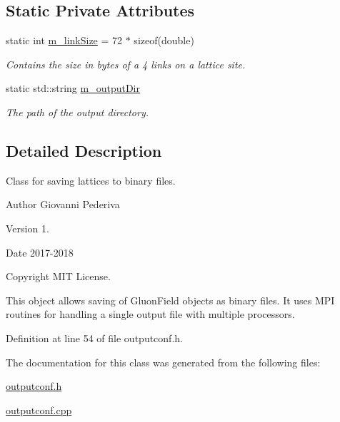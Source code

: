 \subsection*{Static Private Attributes}
\begin{DoxyCompactItemize}
\item 
static int \hyperlink{classLatticeIO_1_1OutputConf_a6866129cf7fe3c5e36034296b2e1bf15}{m\+\_\+link\+Size} = 72 $\ast$ sizeof(double)\hypertarget{classLatticeIO_1_1OutputConf_a6866129cf7fe3c5e36034296b2e1bf15}{}\label{classLatticeIO_1_1OutputConf_a6866129cf7fe3c5e36034296b2e1bf15}

\begin{DoxyCompactList}\small\item\em Contains the size in bytes of a 4 links on a lattice site. \end{DoxyCompactList}\item 
static std\+::string \hyperlink{classLatticeIO_1_1OutputConf_a99c20c25ac656605f5d42f5d3bd8b9d4}{m\+\_\+output\+Dir}\hypertarget{classLatticeIO_1_1OutputConf_a99c20c25ac656605f5d42f5d3bd8b9d4}{}\label{classLatticeIO_1_1OutputConf_a99c20c25ac656605f5d42f5d3bd8b9d4}

\begin{DoxyCompactList}\small\item\em The path of the output directory. \end{DoxyCompactList}\end{DoxyCompactItemize}


\subsection{Detailed Description}
Class for saving lattices to binary files. 

\begin{DoxyAuthor}{Author}
Giovanni Pederiva 
\end{DoxyAuthor}
\begin{DoxyVersion}{Version}
1. 
\end{DoxyVersion}
\begin{DoxyDate}{Date}
2017-\/2018 
\end{DoxyDate}
\begin{DoxyCopyright}{Copyright}
M\+IT License.
\end{DoxyCopyright}
This object allows saving of Gluon\+Field objects as binary files. It uses M\+PI routines for handling a single output file with multiple processors. 

Definition at line 54 of file outputconf.\+h.



The documentation for this class was generated from the following files\+:\begin{DoxyCompactItemize}
\item 
\hyperlink{outputconf_8h}{outputconf.\+h}\item 
\hyperlink{outputconf_8cpp}{outputconf.\+cpp}\end{DoxyCompactItemize}
